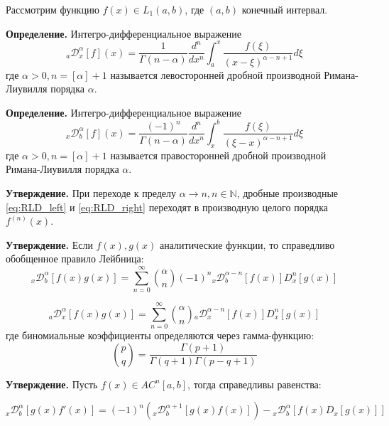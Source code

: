 \documentclass[a4paper, fontsize=14pt]{article}
\newcommand{\RLD}[3]{{}_{#1}\mathcal{D}_{#2}^{\alpha} \left[#3\right]} %
\newcommand{\D}[3]{D_{#1}^{#2} \left[ #3 \right]} %
\newcommand{\RLDa}[4]{{}_{#1}\mathcal{D}_{#2}^{#4} \left[#3\right]} %
\begin{document}
Рассмотрим функцию $f(x) \in L_1(a, b)$, где $(a, b)$ конечный интервал.


\textbf{Определение.} Интегро-дифференциальное выражение
\begin{equation}
  \label{eq:RLD_left}
  \RLD{a}{x}{f}(x) = \frac{1}{\Gamma(n-\alpha)} \frac{d^n}{dx^n} \int_{a}^{x} \frac{f(\xi)}{(x-\xi)^{\alpha-n+1}} d \xi
\end{equation}
где $\alpha > 0, n = [\alpha] + 1$ называется левосторонней дробной производной Римана-Лиувилля порядка $\alpha$.


\textbf{Определение.}  Интегро-дифференциальное выражение
\begin{equation}
  \label{eq:RLD_right}
  \RLD{x}{b}{f}(x) = \frac{(-1)^n}{\Gamma(n-\alpha)} \frac{d^n}{dx^n} \int_{x}^{b} \frac{f(\xi)}{(\xi-x)^{\alpha-n+1}} d \xi
\end{equation}
где $\alpha > 0, n = [\alpha] + 1$ называется правосторонней дробной производной Римана-Лиувилля порядка $\alpha$.



\textbf{Утверждение.}  При переходе к пределу $\alpha \rightarrow n, n \in \mathbb{N}$, дробные производные \eqref{eq:RLD_left} и \eqref{eq:RLD_right} переходят в производную целого порядка $f^{(n)}(x)$.


\textbf{Утверждение.} Если $f(x), g(x)$ аналитические функции, то справедливо обобщенное правило Лейбница:
\begin{equation}
  \RLD{x}{b}{f(x) g(x)} = \sum_{n = 0}^{\infty} \binom{\alpha}{n} (-1)^n \RLDa{x}{b}{f(x)}{\alpha-n} \D{x}{n}{g(x)}
\end{equation}

\begin{equation}
  \RLD{a}{x}{f(x) g(x)} = \sum_{n = 0}^{\infty} \binom{\alpha}{n} \RLDa{a}{x}{f(x)}{\alpha-n} \D{x}{n}{g(x)}
\end{equation}
где биномиальные коэффициенты определяются через гамма-функцию:
\begin{equation*}
  \binom{p}{q} = \frac{\Gamma(p+1)}{\Gamma(q+1) \Gamma(p-q+1)}
\end{equation*}

\textbf{Утверждение.}  Пусть $f(x) \in AC^n [a, b]$, тогда справедливы равенства:

\begin{equation}
  \RLD{x}{b}{g(x) f'(x)} = (-1)^n \left( \RLDa{x}{b}{g(x) f(x)}{\alpha + 1} \right) - \RLD{x}{b}{f(x) \D{x}{}{g(x)}}
\end{equation}
\end{document}
